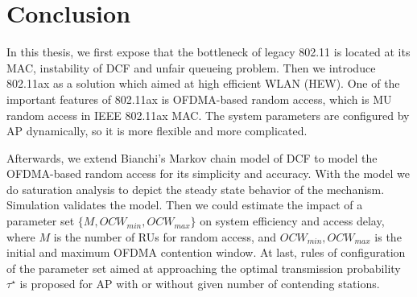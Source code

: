 \chapter{Conclusion}   \label{chp_conclu}
In this thesis, we first expose that the bottleneck of legacy 802.11 is located at its MAC, instability of DCF and unfair queueing problem. 
Then we introduce 802.11ax as a solution which aimed at high efficient WLAN (HEW).
One of the important features of 802.11ax is OFDMA-based random access, which is MU random access in IEEE 802.11ax MAC. 
The system parameters are configured by AP dynamically, so it is more flexible and more complicated. 

Afterwards, we extend Bianchi's Markov chain model of DCF to model the OFDMA-based random access for its simplicity and accuracy. 
With the model we do saturation analysis to depict the steady state behavior of the mechanism.
Simulation validates the model. 
Then we could estimate the impact of a parameter set $\lbrace M, OCW_{min}, OCW_{max} \rbrace$ on system efficiency and access delay, where $M$ is the number of RUs for random access,  and $OCW_{min}, OCW_{max}$ is the initial and maximum OFDMA contention window. 
At last, rules of configuration of the parameter set aimed at approaching the optimal transmission probability $\tau^\star$ is proposed for AP with or without given number of contending stations.